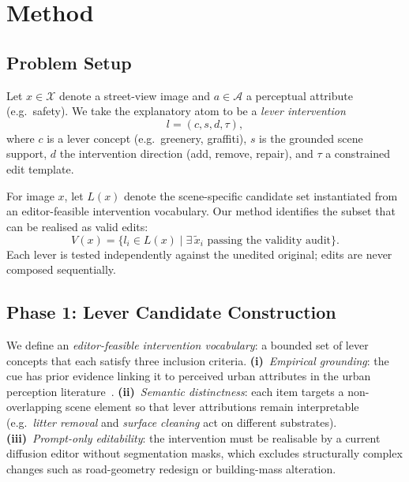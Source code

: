 \section{Method}
\label{sec:method}

\subsection{Problem Setup}

Let $x \in \mathcal{X}$ denote a street-view image and
$a \in \mathcal{A}$ a perceptual attribute (e.g.\ safety). We take the
explanatory atom to be a \emph{lever intervention}
\begin{equation}
  l = (c, s, d, \tau),
\end{equation}
where $c$ is a lever concept (e.g.\ greenery, graffiti), $s$ is the
grounded scene support, $d$ the intervention direction (add, remove,
repair), and $\tau$ a constrained edit template.

For image $x$, let $L(x)$ denote the scene-specific candidate set
instantiated from an editor-feasible intervention vocabulary. Our method identifies the
subset that can be realised as valid edits:
\begin{equation}
  V(x) = \{ l_i \in L(x) \mid \exists\, \tilde{x}_i \text{ passing the validity audit} \}.
\end{equation}
Each lever is tested independently against the unedited original; edits
are never composed sequentially.

\subsection{Phase 1: Lever Candidate Construction}

We define an \emph{editor-feasible intervention vocabulary}: a bounded
set of lever concepts that each satisfy three inclusion criteria.
\textbf{(i)}~\emph{Empirical grounding}: the cue has prior evidence
linking it to perceived urban attributes in the urban perception
literature~\cite{jacobs1961,newman1972,li2015greenery,jiang2018brokenwindows,portnov2020lighting}.
\textbf{(ii)}~\emph{Semantic distinctness}: each item targets a
non-overlapping scene element so that lever attributions remain
interpretable (e.g.\ \emph{litter removal} and \emph{surface cleaning}
act on different substrates).
\textbf{(iii)}~\emph{Prompt-only editability}: the intervention must be
realisable by a current diffusion editor without segmentation masks,
which excludes structurally complex changes such as road-geometry
redesign or building-mass alteration.

